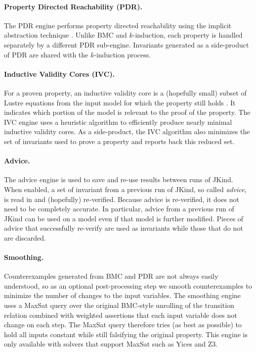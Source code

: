 \documentclass{llncs}
\begin{document}
\paragraph{Property Directed Reachability (PDR).} The PDR engine
performs property directed reachability \cite{} using the implicit
abstraction technique \cite{}. Unlike BMC and $k$-induction, each
property is handled separately by a different PDR sub-engine.
Invariants generated as a side-product of PDR are shared with the
$k$-induction process.

\paragraph{Inductive Validity Cores (IVC).} For a proven property, an
inductive validity core is a (hopefully small) subset of Lustre
equations from the input model for which the property still holds
\cite{}. It indicates which portion of the model is relevant to the
proof of the property. The IVC engine uses a heuristic algorithm to
efficiently produce nearly minimal inductive validity cores. As a
side-product, the IVC algorithm also minimizes the set of invariants
used to prove a property and reports back this reduced set.

\paragraph{Advice.} The advice engine is used to save and re-use
results between runs of JKind. When enabled, a set of invariant from a
previous run of JKind, so called {\em advice}, is read in and
(hopefully) re-verified. Because advice is re-verified, it does not
need to be completely accurate. In particular, advice from a previous
run of JKind can be used on a model even if that model is further
modified. Pieces of advice that successfully re-verify are used as
invariants while those that do not are discarded.

\paragraph{Smoothing.} Counterexamples generated from BMC and PDR are
not always easily understood, so as an optional post-processing step
we smooth counterexamples to minimize the number of changes to the
input variables. The smoothing engine uses a {\sc MaxSat} query over
the original BMC-style unrolling of the transition relation combined
with weighted assertions that each input variable does not change on
each step. The {\sc MaxSat} query therefore tries (as best as
possible) to hold all inputs constant while still falsifying the
original property. This engine is only available with solvers that
support {\sc MaxSat} such as Yices and Z3.
\end{document}
